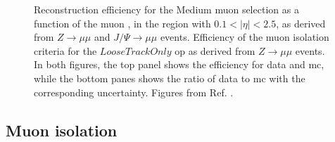 \begin{figure}[h]
\begin{center}
\end{center}
 \caption{  Reconstruction efficiency for the Medium muon selection as a function of the muon \pt, in the region with $0.1<|\eta|<2.5$, as derived from $Z\rightarrow \mu \mu$ and $J/\Psi \rightarrow \mu \mu$ events. 
  Efficiency of the muon isolation criteria for the $LooseTrackOnly$ \gls{op} as derived from $Z\rightarrow \mu \mu$  events.
 In both figures, the top panel shows the efficiency for data and \gls{mc}, while the bottom panes shows the ratio of data to \gls{mc} with the corresponding uncertainty.
 Figures from Ref. \cite{Aad:2016jkr}.}
  \label{fig:obj:muon}
\end{figure}

\subsection{Muon isolation}
\label{sec:muoniso}

